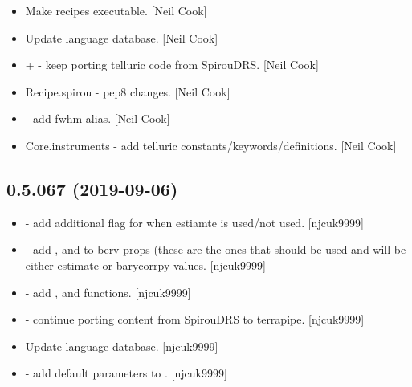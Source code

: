 \documentclass[a4paper,10pt,english]{report}
\begin{document}
\begin{itemize}
\item {} 
Make recipes executable. {[}Neil Cook{]}

\item {} 
Update language database. {[}Neil Cook{]}

\item {} 
 +  - keep porting telluric code from
SpirouDRS. {[}Neil Cook{]}

\item {} 
Recipe.spirou - pep8 changes. {[}Neil Cook{]}

\item {} 
 - add fwhm alias. {[}Neil Cook{]}

\item {} 
Core.instruments - add telluric constants/keywords/definitions. {[}Neil
Cook{]}

\end{itemize}


\subsection{0.5.067 (2019-09-06)}
\label{\detokenize{misc/changelog:id75}}\begin{itemize}
\item {} 
 - add additional flag for when estiamte is
used/not used. {[}njcuk9999{]}

\item {} 
 - add ,  and  to berv props
(these are the ones that should be used and will be either estimate or
barycorrpy values. {[}njcuk9999{]}

\item {} 
 - add ,
 and  functions. {[}njcuk9999{]}

\item {} 
 - continue porting content from SpirouDRS to
terrapipe. {[}njcuk9999{]}

\item {} 
Update language database. {[}njcuk9999{]}

\item {} 
 - add default parameters to .
{[}njcuk9999{]}

\end{itemize}
\end{document}
